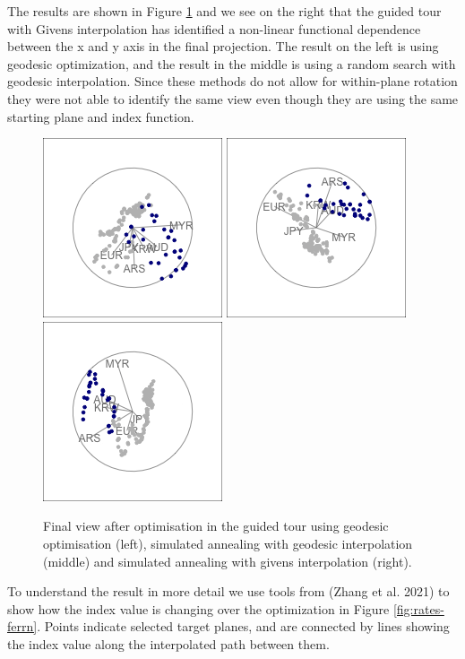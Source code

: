 The results are shown in Figure \ref{fig:rates-tour-static} and we see on the right that the guided tour with Givens interpolation has identified a non-linear functional dependence between the x and y axis in the final projection. The result on the left is using geodesic optimization, and the result in the middle is using a random search with geodesic interpolation. Since these methods do not allow for within-plane rotation they were not able to identify the same view even though they are using the same starting plane and index function.

\begin{figure}

{\centering \includegraphics[width=0.3\linewidth]{rates_tour_geodesic_final} \includegraphics[width=0.3\linewidth]{rates_tour_better_final} \includegraphics[width=0.3\linewidth]{rates_tour_givens_final} 

}

\caption{Final view after optimisation in the guided tour using geodesic optimisation (left), simulated annealing with geodesic interpolation (middle) and simulated annealing with givens interpolation (right).}\label{fig:rates-tour-static}
\end{figure}

To understand the result in more detail we use tools from  (Zhang et al. 2021) to show how the index value is changing over the optimization in Figure \ref{fig:rates-ferrn}. Points indicate selected target planes, and are connected by lines showing the index value along the interpolated path between them.

